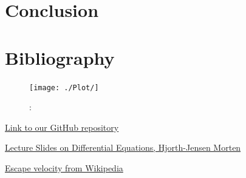 \documentclass{article}
\begin{document}


\section{Conclusion}


\newpage
\section{Bibliography}

\begin{figure}[H]
    \begin{center}
        \texttt{[image: ./Plot/]}
        \caption{: }
        \label{}
    \end{center}
\end{figure}

\href{https://github.com/emmernme/MENA-Compfys/tree/master/Project5}{Link to our GitHub repository}

\href{http://compphysics.github.io/ComputationalPhysics/doc/pub/ode/pdf/ode-print.pdf}{Lecture Slides on Differential Equations, Hjorth-Jensen Morten}

\href{https://en.wikipedia.org/wiki/Escape_velocity}{Escape velocity from Wikipedia}
\end{document}
